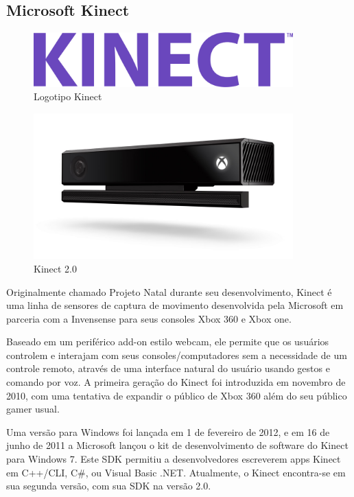 	\subsection{Microsoft Kinect}\label{subsec-kinect}
		 \begin{figure}[h!]
		\caption{\label{fig_kinectlogo}  Logotipo Kinect}
		\begin{center}
			\includegraphics[width=100mm]{kinect_logo.png}	
		\end{center}
	\end{figure}
	 \begin{figure}[h!]
	\caption{\label{fig_kinect}  Kinect 2.0}
	\begin{center}
		\includegraphics[width=100mm]{kinect20.jpg}	
	\end{center}
\end{figure}
	Originalmente chamado Projeto Natal durante seu desenvolvimento, Kinect é uma linha de sensores de captura de movimento desenvolvida pela Microsoft em parceria com a Invensense para seus consoles Xbox 360 e Xbox one.\par

	Baseado em um periférico add-on estilo webcam, ele permite que os usuários controlem e interajam com seus consoles/computadores sem a necessidade de um controle remoto, através de uma interface natural do usuário usando gestos e comando por voz.
	A primeira geração do Kinect foi introduzida em novembro de 2010, com uma tentativa de expandir o público de Xbox 360 além do seu público gamer usual. 
	
	Uma versão para Windows foi lançada em 1 de fevereiro de 2012, e em 16 de junho de 2011 a Microsoft lançou o kit  de desenvolvimento de software do Kinect para Windows 7. Este SDK permitiu a desenvolvedores escreverem apps Kinect em C++/CLI, C\#, ou Visual Basic .NET.
	Atualmente, o Kinect encontra-se em sua segunda versão, com sua SDK na versão 2.0\cite{microsoft-kinect}.

